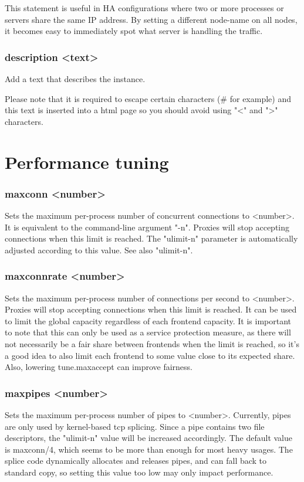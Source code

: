   This statement is useful in HA configurations where two or more processes or
  servers share the same IP address. By setting a different node-name on all
  nodes, it becomes easy to immediately spot what server is handling the
  traffic.

\subsubsection[description]{description <text>}
  Add a text that describes the instance.

  Please note that it is required to escape certain characters (# for example)
  and this text is inserted into a html page so you should avoid using
  "<" and ">" characters.

\section{Performance tuning}

\subsubsection[maxconn]{maxconn <number>}
  Sets the maximum per-process number of concurrent connections to <number>. It
  is equivalent to the command-line argument "-n". Proxies will stop accepting
  connections when this limit is reached. The "ulimit-n" parameter is
  automatically adjusted according to this value. See also "ulimit-n".

\subsubsection[maxconnrate]{maxconnrate <number>}
  Sets the maximum per-process number of connections per second to <number>.
  Proxies will stop accepting connections when this limit is reached. It can be
  used to limit the global capacity regardless of each frontend capacity. It is
  important to note that this can only be used as a service protection measure,
  as there will not necessarily be a fair share between frontends when the
  limit is reached, so it's a good idea to also limit each frontend to some
  value close to its expected share. Also, lowering tune.maxaccept can improve
  fairness.

\subsubsection[maxpipes]{maxpipes <number>}
  Sets the maximum per-process number of pipes to <number>. Currently, pipes
  are only used by kernel-based tcp splicing. Since a pipe contains two file
  descriptors, the "ulimit-n" value will be increased accordingly. The default
  value is maxconn/4, which seems to be more than enough for most heavy usages.
  The splice code dynamically allocates and releases pipes, and can fall back
  to standard copy, so setting this value too low may only impact performance.

